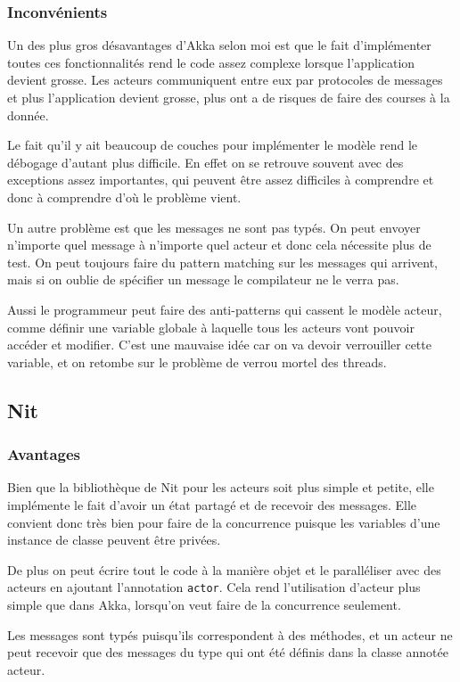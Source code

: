 \documentclass[11pt, a4paper]{article}
\begin{document}
\subsubsection{Inconvénients}
Un des plus gros désavantages d'Akka selon moi est que le fait d'implémenter toutes ces fonctionnalités rend le code assez complexe lorsque l'application devient grosse. Les acteurs communiquent entre eux par protocoles de messages et plus l'application devient grosse, plus ont a de risques de faire des courses à la donnée. 
\par Le fait qu'il y ait beaucoup de couches pour implémenter le modèle rend le débogage d'autant plus difficile. En effet on se retrouve souvent avec des exceptions assez importantes, qui peuvent être assez difficiles à comprendre et donc à comprendre d’où le problème vient.
\par Un autre problème est que les messages ne sont pas typés. On peut envoyer n'importe quel message à n'importe quel acteur et donc cela nécessite plus de test. On peut toujours faire du pattern matching sur les messages qui arrivent, mais si on oublie de spécifier un message le compilateur ne le verra pas.
\par Aussi le programmeur peut faire des anti-patterns qui cassent le modèle acteur, comme définir une variable globale à laquelle tous les acteurs vont pouvoir accéder et modifier. C'est une mauvaise idée car on va devoir verrouiller cette variable, et on retombe sur le problème de verrou mortel des threads.

\subsection{Nit}

\subsubsection{Avantages}
Bien que la bibliothèque de Nit pour les acteurs soit plus simple et petite, elle implémente le fait d'avoir un état partagé et de recevoir des messages. Elle convient donc très bien pour faire de la concurrence puisque les variables d'une instance de classe peuvent être privées.
\par De plus on peut écrire tout le code à la manière objet et le paralléliser avec des acteurs en ajoutant l'annotation \texttt{actor}. Cela rend l'utilisation d'acteur plus simple que dans Akka, lorsqu'on veut faire de la concurrence seulement.
\par Les messages sont typés puisqu'ils correspondent à des méthodes, et un acteur ne peut recevoir que des messages du type qui ont été définis dans la classe annotée acteur. 
\end{document}
